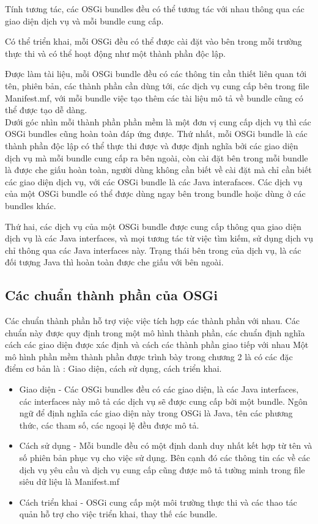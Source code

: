 Tính tương tác, các OSGi bundles đều có thể tương tác với nhau thông qua các giao diện dịch vụ và mỗi bundle cung cấp.

Có thể triển khai, mỗi OSGi đều có thể được cài đặt vào bên trong mỗi trường thực thi và có thể hoạt động như một thành phần độc lập.

Được làm tài liệu, mỗi OSGi bundle đều có các thông tin cần thiết liên quan tới tên, phiên bản, các thành phần cần dùng tới, các dịch vụ cung cấp bên trong file Manifest.mf, với mỗi bundle việc tạo thêm các tài liệu mô tả về bundle cũng có thể được tạo dễ dàng.\\

Dưới góc nhìn mỗi thành phần phần mềm là một đơn vị cung cấp dịch vụ thì các OSGi bundles cũng hoàn toàn đáp ứng được.
Thứ nhất, mỗi OSGi bundle là các thành phần độc lập có thể thực thi được và được định nghĩa bởi các giao diện dịch vụ mà mỗi bundle cung cấp ra bên ngoài, còn cài đặt bên trong mỗi bundle là được che giấu hoàn toàn, người dùng không cần biết về cài đặt mà chỉ cần biết các giao diện dịch vụ, với các OSGi bundle là các Java interafaces. Các dịch vụ của một OSGi bundle có thể được dùng ngay bên trong bundle hoặc dùng ở các bundles khác.

Thứ hai, các dịch vụ của một OSGi bundle được cung cấp thông qua giao diện dịch vụ là các Java interfaces, và mọi tương tác từ việc tìm kiếm, sử dụng dịch vụ chỉ thông qua các Java interfaces này. Trạng thái bên trong của dịch vụ, là các đối tượng Java thì hoàn toàn được che giấu với bên ngoài.

\subsection{Các chuẩn thành phần của OSGi}
Các chuẩn thành phần hỗ trợ việc việc tích hợp các thành phần với nhau. Các chuẩn này được quy định trong một mô hình thành phần, các chuẩn định nghĩa cách các giao diện được xác định và cách các thành phần giao tiếp với nhau
Một mô hình phần mềm thành phần được trình bày trong chương 2 là có các đặc điểm cơ bản là : Giao diện, cách sử dụng, cách triển khai.

\begin{itemize}
	\item Giao diện - Các OSGi bundles đều có các giao diện, là các Java interfaces, các interfaces này mô tả các dịch vụ sẽ được cung cấp bởi một bundle. Ngôn ngữ để định nghĩa các giao diện này trong OSGi là Java, tên các phương thức, các tham số, các ngoại lệ đều được mô tả.
	\item Cách sử dụng - Mỗi bundle đều có một định danh duy nhất kết hợp từ tên và số phiên bản phục vụ cho việc sử dụng. Bên cạnh đó các thông tin các về các dịch vụ yêu cầu và dịch vụ cung cấp cũng được mô tả tường minh trong file siêu dữ liệu là Manifest.mf
	\item Cách triển khai - OSGi cung cấp một môi trường thực thi và các thao tác quản hỗ trợ cho việc triển khai, thay thế các bundle.
\end{itemize} 

